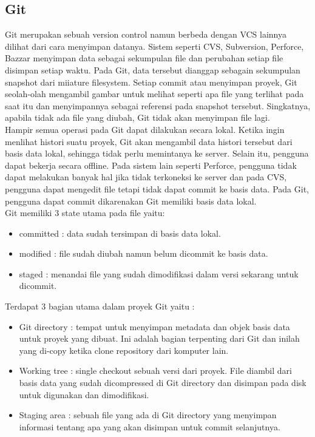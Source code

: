 \subsection{Git}
Git merupakan sebuah version control namun berbeda dengan VCS lainnya dilihat dari cara menyimpan datanya. Sistem seperti CVS, Subversion, Perforce, Bazzar menyimpan data sebagai sekumpulan file dan perubahan setiap file disimpan setiap waktu. Pada Git, data tersebut dianggap sebagain sekumpulan snapshot dari miiature filesystem. Setiap commit atau menyimpan proyek, Git seolah-olah mengambil gambar untuk melihat seperti apa file yang terlihat pada saat itu dan menyimpannya sebagai referensi pada snapshot tersebut. Singkatnya, apabila tidak ada file yang diubah, Git tidak akan menyimpan file lagi.\\

Hampir semua operasi pada Git dapat dilakukan secara lokal. Ketika ingin menlihat histori suatu proyek, Git akan mengambil data histori tersebut dari basis data lokal, sehingga tidak perlu memintanya ke server. Selain itu, pengguna dapat bekerja secara offline. Pada sistem lain seperti Perforce, pengguna tidak dapat melakukan banyak hal jika tidak terkoneksi ke server dan pada CVS, pengguna dapat mengedit file tetapi tidak dapat commit ke basis data. Pada Git, pengguna dapat commit dikarenakan Git memiliki basis data lokal.\\

Git memiliki 3 state utama pada file yaitu: 

\begin{itemize}
	\item committed : data sudah tersimpan di basis data lokal.
	\item modified : file sudah diubah namun belum dicommit ke basis data.
	\item staged : menandai file yang sudah dimodifikasi dalam versi sekarang untuk dicommit.
\end{itemize}

Terdapat 3 bagian utama dalam proyek Git yaitu : 

\begin{itemize}
	\item Git directory : tempat untuk menyimpan metadata dan objek basis data untuk proyek yang dibuat. Ini adalah bagian terpenting dari Git dan inilah yang di-copy ketika clone repository dari komputer lain.
	\item Working tree : single checkout sebuah versi dari proyek. File diambil dari basis data yang sudah dicompressed di Git directory dan disimpan pada disk untuk digunakan dan dimodifikasi.
	\item Staging area : sebuah file yang ada di Git directory yang menyimpan informasi tentang apa yang akan disimpan untuk commit selanjutnya.  
\end{itemize}

